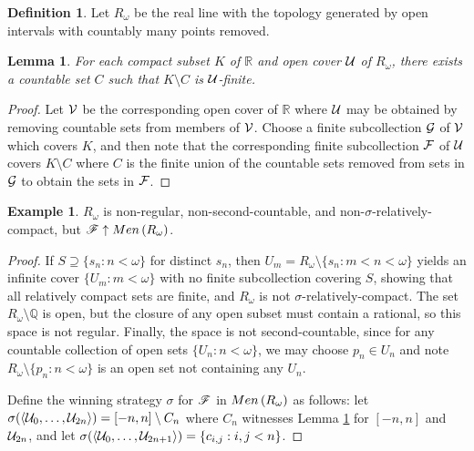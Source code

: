 \documentclass{amsart}
\newtheorem{lemma}[theorem]{Lemma}
\theoremstyle{definition}
\newtheorem{definition}[theorem]{Definition}
\newtheorem{example}[theorem]{Example}
\begin{document}
\begin{definition}
  Let \(R_\omega\) be the real line with the topology generated by open
  intervals with countably many points removed.
\end{definition}

\begin{lemma}\label{rOmegaLemma}
  For each compact subset \(K\) of \(\mathbb R\)
  and open cover \(\mathcal{U}\) of \(R_\omega\),
  there exists a countable set \(C\) such that \(K\setminus C\)
  is \(\mathcal{U}\)-finite.
\end{lemma}

\begin{proof}
  Let \(\mathcal{V}\) be the corresponding open cover of \(\mathbb R\) where
  \(\mathcal{U}\) may be obtained by removing countable sets from members of
  \(\mathcal{V}\). Choose a finite subcollection \(\mathcal{G}\) of \(\mathcal{V}\) which
  covers \(K\), and then note that the corresponding finite subcollection
  \(\mathcal{F}\) of \(\mathcal{U}\) covers \(K\setminus C\) where \(C\) is the
  finite union of the countable sets removed from sets in \(\mathcal{G}\)
  to obtain the sets in \(\mathcal{F}\).
\end{proof}

\begin{example}
  \(R_\omega\) is non-regular, non-second-countable, and
  non-\(\sigma\)-relatively-compact, but \(\mathscr{F}\uparrow Men\left({R_\omega}\right)\).
\end{example}

\begin{proof}
  If \(S\supseteq\{s_n:n<\omega\}\) for distinct \(s_n\),
  then \(U_m=R_\omega\setminus\{s_n:m<n<\omega\}\) yields an
  infinite cover \(\{U_m:m<\omega\}\) with no finite subcollection covering
  \(S\), showing that all relatively compact sets are finite, and \(R_\omega\)
  is not \(\sigma\)-relatively-compact. The set \(R_\omega\setminus\mathbb Q\)
  is open, but the closure of any open subset must contain a rational, so
  this space is not regular. Finally, the space is not second-countable,
  since for any countable collection of open sets \(\{U_n:n<\omega\}\),
  we may choose \(p_n\in U_n\)
  and note \(R_\omega\setminus\{p_n:n<\omega\}\) is an open set not containing
  any \(U_n\).

  Define the winning strategy \(\sigma\) for \(\mathscr{F}\) in
  \(Men\left({R_\omega}\right)\) as follows: let
  \(\sigma(\langle\mathcal{U}_0,\dots,\mathcal{U}_{2n}\rangle)=[-n,n]\setminus C_n\)
  where \(C_n\) witnesses Lemma \ref{rOmegaLemma} for \([-n,n]\)
  and \(\mathcal{U}_{2n}\),
  and let \(\sigma(\langle\mathcal{U}_0,\dots,\mathcal{U}_{2n+1}\rangle)=\{c_{i,j} : i,j < n\}\).
\end{proof}
\end{document}
